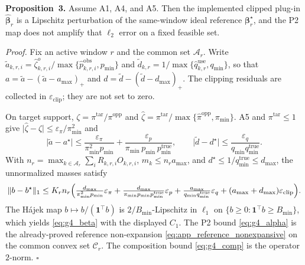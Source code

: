 \noindent\textbf{Proposition~3.}
Assume A1, A4, and A5.  Then the implemented clipped plug-in
$\widehat{\boldsymbol\beta}_r$ is a Lipschitz perturbation of the
same-window ideal reference $\boldsymbol\beta_r^\star$, and the P2 map
does not amplify that $\ell_2$ error on a fixed feasible set.

\noindent\emph{Proof.}
Fix an active window $r$ and the common set $\mathcal{A}_r$.
Write $\widetilde a_{k,r,i}=\widehat\zeta^{o}_{k,r,i}/
\max\{\widehat p^{\mathrm{obs}}_{k,r,i},p_{\min}\}$ and
$\widetilde d_{k,r}=1/\max\{\widehat q^{\mathrm{use}}_{k,r},q_{\min}\}$,
so that
$a=\widetilde a-(\widetilde a-a_{\max})_+$ and
$d=\widetilde d-(\widetilde d-d_{\max})_+$.
The clipping residuals are collected in
$\varepsilon_{\mathrm{clip}}$; they are not set to zero.

On target support, $\zeta=\pi^{\mathrm{tar}}/\pi^{\mathrm{opp}}$ and
$\widehat\zeta=\pi^{\mathrm{tar}}/\max\{\widehat\pi^{\mathrm{opp}},
\pi_{\min}\}$.  A5 and $\pi^{\mathrm{tar}}\le1$ give
$\lvert\widehat\zeta-\zeta\rvert\le\varepsilon_\pi/\pi_{\min}^2$ and
\begin{equation}
 \bigl\lvert\widetilde a-a^\star\bigr\rvert
 \le
 \frac{\varepsilon_\pi}{\pi_{\min}^2 p_{\min}}
 +\frac{\varepsilon_p}{\pi_{\min}\,p_{\min}\,p_{\min}^{\mathrm{true}}},
 \qquad
 \bigl\lvert\widetilde d-d^\star\bigr\rvert
 \le
 \frac{\varepsilon_q}{q_{\min}q_{\min}^{\mathrm{true}}}.
 \label{eq:app_plugin_lipschitz}
\end{equation}
With $n_r=\max_{k\in\mathcal{A}_r}\sum_i R_{k,r,i}O_{k,r,i}$,
$m_k\le n_r a_{\max}$, and
$d^\star\le 1/q_{\min}^{\mathrm{true}}\le d_{\max}$,
the unnormalized masses satisfy
\begin{equation}
 \|b-b^\star\|_1
 \le
 K_r n_r
 \Bigl(
 \tfrac{d_{\max}}{\pi_{\min}^2 p_{\min}}\varepsilon_\pi
 +\tfrac{d_{\max}}{\pi_{\min}p_{\min}p_{\min}^{\mathrm{true}}}\varepsilon_p
 +\tfrac{a_{\max}}{q_{\min}q_{\min}^{\mathrm{true}}}\varepsilon_q
 +(a_{\max}+d_{\max})\varepsilon_{\mathrm{clip}}
 \Bigr).
 \label{eq:app_plugin_mass}
\end{equation}
The H\'ajek map $b\mapsto b/(\mathbf{1}^{\top}b)$ is
$2/B_{\min}$-Lipschitz in $\ell_1$ on
$\{b\ge0:\mathbf{1}^{\top}b\ge B_{\min}\}$, which yields
\eqref{eq:g4_beta} with the displayed $C_1$.
The P2 bound \eqref{eq:g4_alpha} is the already-proved reference
non-expansion \eqref{eq:app_reference_nonexpansive} on the common
convex set $\mathcal{C}_r$.  The composition bound
\eqref{eq:g4_comp} is the operator $2$-norm.
\hfill$\square$

